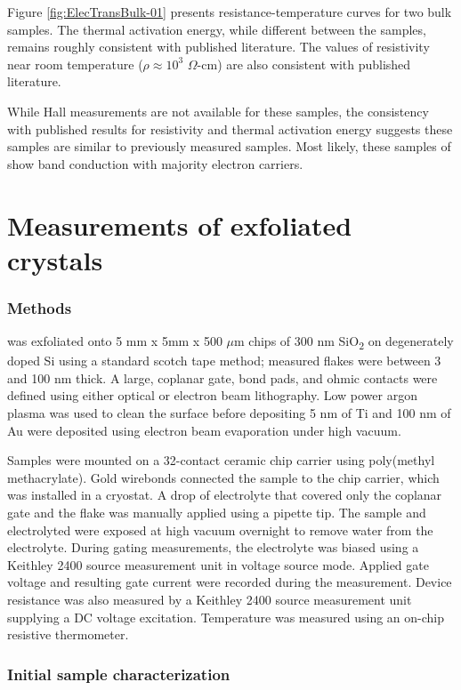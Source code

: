 Figure \ref{fig:ElecTransBulk-01} presents resistance-temperature curves for two bulk \rucl samples. The thermal activation energy, while different between the samples, remains roughly consistent with published literature. The values of resistivity near room temperature ($\rho \approx 10^{3}$ $\Omega$-cm) are also consistent with published literature.

While Hall measurements are not available for these samples, the consistency with published results for resistivity and thermal activation energy suggests these samples are similar to previously measured samples. Most likely, these samples of \rucl show band conduction with majority electron carriers.

\section{Measurements of exfoliated \texorpdfstring{\rucl}{RuCl3}crystals}

\subsubsection{Methods}
\rucl was exfoliated onto 5 mm x 5mm x 500 $\mu$m chips of 300 nm SiO\textsubscript{2} on degenerately doped Si using a standard scotch tape method; measured \rucl flakes were between 3 and 100 nm thick. A large, coplanar gate, bond pads, and ohmic contacts were defined using either optical or electron beam lithography. Low power argon plasma was used to clean the surface before depositing 5 nm of Ti and 100 nm of Au were deposited using electron beam evaporation under high vacuum.

Samples were mounted on a 32-contact ceramic chip carrier using poly(methyl methacrylate). Gold wirebonds connected the sample to the chip carrier, which was installed in a cryostat. A drop of electrolyte that covered only the coplanar gate and the \rucl flake was manually applied using a pipette tip. The sample and electrolyted were exposed at high vacuum overnight to remove water from the electrolyte. During gating measurements, the electrolyte was biased using a Keithley 2400 source measurement unit in voltage source mode. Applied gate voltage and resulting gate current were recorded during the measurement. Device resistance was also measured by a Keithley 2400 source measurement unit supplying a DC voltage excitation. Temperature was measured using an on-chip resistive thermometer.

\subsubsection{Initial sample characterization}

